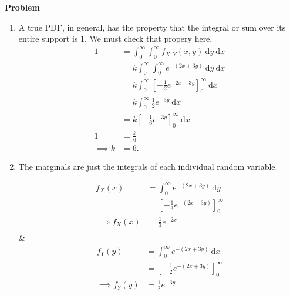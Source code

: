 \documentclass[12pt]{article}
\newenvironment{Ex}{\textbf{Problem}\vspace{.75em}\\}{}
\newcommand{\dd}[1]{\:\mathrm{d}{#1}}
\begin{document}
\begin{enumerate}
\begin{Ex}
\begin{solution}
        \begin{enumerate}
        \item A true PDF, in general, has the property that the
          integral or sum over its entire support is $1$. We must
          check that propery here.
          \begin{equation}
            \label{eq:6a-sol}
            \begin{aligned}
              1 &= \int_0^\infty \int_0^\infty f_{X,Y}(x,y) \dd{y}
              \dd{x} \\
              &= k \int_0^\infty \int_0^\infty e^{-(2x+3y)} \dd{y}
              \dd{x} \\
              &= k \int_0^\infty
              \left[-\frac{1}{2}e^{-2x-3y}\right]_0^\infty
              \dd{x} \\
              &= k \int_0^\infty \frac{1}{2}e^{-3y} \dd{x} \\
              &= k \left[-\frac{1}{6}e^{-3y}\right]_0^\infty \dd{x} \\
              1 &= \frac{k}{6} \\
              \implies k &= 6.
            \end{aligned}
          \end{equation}
        \item The marginals are just the integrals of each individual
          random variable.
          \begin{multicols}{2}
            \begin{equation}
              \label{eq:5b-marginal-x}
              \begin{aligned}
                f_X(x) &= \int_0^\infty e^{-(2x+3y)} \dd{y} \\
                &= \left[-\frac{1}{3}e^{-(2x+3y)}\right]_0^\infty \\
                \implies f_X(x) &= \frac{1}{3}e^{-2x} \\
              \end{aligned}
            \end{equation} &
            \begin{equation}
              \label{eq:5b-marginal-y}
              \begin{aligned}
                f_Y(y) &= \int_0^\infty e^{-(2x+3y)} \dd{x} \\
                &= \left[-\frac{1}{2}e^{-(2x+3y)}\right]_0^\infty \\
                \implies f_Y(y) &= \frac{1}{2}e^{-3y} \\

\end{aligned}
\end{equation}
\end{multicols}
\end{enumerate}
\end{solution}
\end{Ex}
\end{enumerate}
\end{document}
